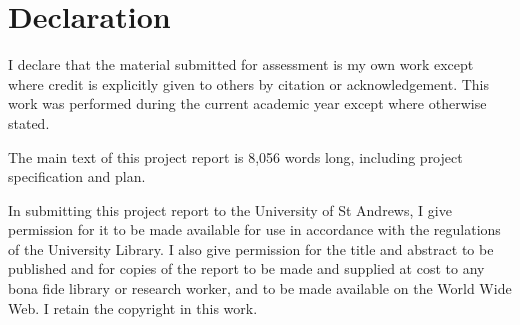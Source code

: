 \documentclass[]{report}
\begin{document}
\section{Declaration}
I declare that the material submitted for
assessment is my own work except where credit is
explicitly given to others by citation or
acknowledgement. This work was performed during
the current academic year except where otherwise
stated.

The main text of this project report is 8,056 words long, including project specification and plan.

In submitting this project report to the University of
St Andrews, I give permission for it to be made
available for use in accordance with the regulations of
the University Library. I also give permission for
the title and abstract to be published and for copies of
the report to be made and supplied at cost to any bona
fide library or research worker, and to be made
available on the World Wide Web. I retain the
copyright in this work.











\nocite{*}
\printbibliography{}
\end{document}
